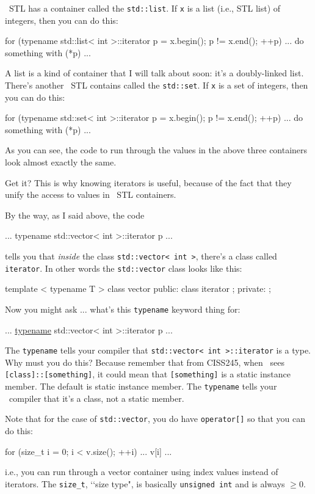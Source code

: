 \cpp\ STL has a container called the \verb!std::list!.
If \verb!x! is a list (i.e., STL list) of integers,
then you can do this:
\begin{console}[fontsize=\footnotesize]
for (typename std::list< int >::iterator p = x.begin();
     p != x.end(); ++p)
{
     ... do something with (*p) ...
}
\end{console}
A list is a kind of container that I will talk about soon: it's a
doubly-linked list.
There's another \cpp\ STL contains called the \verb!std::set!.
If \verb!x! is a set of integers, then you can do this:
\begin{console}[fontsize=\footnotesize]
for (typename std::set< int >::iterator p = x.begin();
     p != x.end(); ++p)
{
     ... do something with (*p) ...
}
\end{console}
As you can see, the code to run through the values in the
above three containers look almost exactly the same.

Get it? This is why knowing iterators is useful, because of the
fact that they unify the access to values in \cpp\ STL containers.

By the way, as I said above, the code
\begin{console}[fontsize=\footnotesize]
... typename std::vector< int >::iterator p ...
\end{console}
tells you that \textit{inside} the class \texttt{std::vector< int >},
there's a class called \texttt{iterator}.
In other words the \texttt{std::vector} class looks like this:
\begin{console}[frame=single, fontsize=\footnotesize]
template < typename T >
class vector
{
public:
    class iterator
    {
    };
private:
};
\end{console}
Now you might ask ... what's this \verb!typename! keyword thing for:
\begin{console}[frame=single,commandchars=\\\{\},fontsize=\footnotesize]
... \underline{typename} std::vector< int >::iterator p ...
\end{console}
The \verb!typename! tells your compiler that
\verb!std::vector< int >::iterator! is a type.
Why must you do this?
Because remember that from CISS245, when \cpp\ sees \verb![class]::[something]!,
it could mean that \verb![something]! is a static instance member.
The default is static instance member.
The \verb!typename! tells your \cpp\ compiler that it's a class,
not a static member.

Note that for the case of \verb!std::vector!, you do have
\verb!operator[]! so that you can do this:
\begin{console}[fontsize=\footnotesize]
for (size_t i = 0; i < v.size(); ++i)
{
     ... v[i] ...
}
\end{console}
i.e., you can run through a vector container using index values
instead of iterators.
The \verb!size_t!, \lq\lq size type", is basically \verb!unsigned int!
and is always $\geq 0$.

